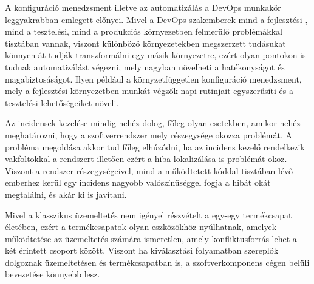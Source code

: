 A konfiguráció menedzsment illetve az automatizálás a DevOps munkakör leggyakrabban emlegett előnyei. Mivel a DevOps szakemberek mind a fejlesztési-, mind a tesztelési, mind a produkciós környezetben felmerülő problémákkal tisztában vannak, viszont különböző környezetekben megszerzett tudásukat könnyen át tudják transzformálni egy másik környezetre, ezért olyan pontokon is tudnak automatizálást végezni, mely nagyban növelheti a hatékonyságot és magabiztosáságot. Ilyen például a környzetfüggetlen konfiguráció menedzsment, mely a fejlesztési környezetben munkát végzők napi rutinjait egyszerűsíti és a tesztelési lehetőségeiket növeli.

Az incidensek kezelése mindig nehéz dolog, főleg olyan esetekben, amikor nehéz meghatározni, hogy a szoftverrendszer mely részegysége okozza problémát. A probléma megoldása akkor tud főleg elhúzódni, ha az incidens kezelő rendelkezik vakfoltokkal a rendszert illetően ezért a hiba lokalizálása is problémát okoz. Viszont a rendszer részegységeivel, mind a működtetett kóddal tisztában lévő emberhez kerül egy incidens nagyobb valószínűséggel fogja a hibát okát megtalálni, és akár ki is javítani.

Mivel a klasszikus üzemeltetés nem igényel részvételt a egy-egy termékcsapat életében, ezért a termékcsapatok olyan eszközökhöz nyúlhatnak, amelyek működtetése az üzemeltetés számára ismeretlen, amely konfliktusforrás lehet a két érintett csoport között. Viszont ha kiválasztási folyamatban szereplők dolgoznak üzemeltetésen és termékcsapatban is, a szoftverkomponens cégen belüli bevezetése könnyebb lesz.